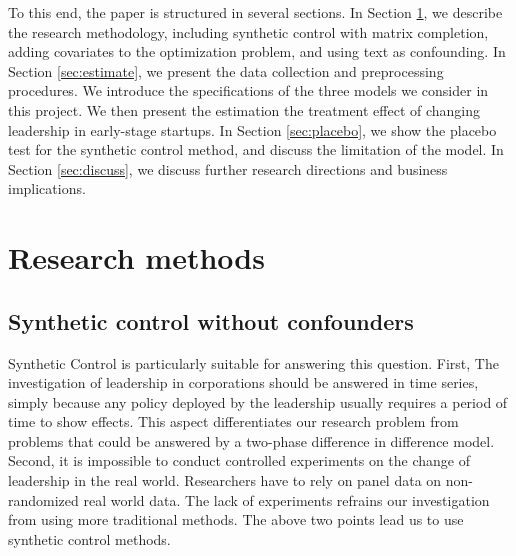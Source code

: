 \documentclass[12pt]{article}
\begin{document}
To this end, the paper is structured in several sections. In Section \ref{sec:methods}, we describe the research methodology, including synthetic control with matrix completion, adding covariates to the optimization problem, and using text as confounding. In Section \ref{sec:estimate}, we present the data collection and preprocessing procedures. We introduce the specifications of the three models we consider in this project. We then present the estimation the treatment effect of changing leadership in early-stage startups. In Section \ref{sec:placebo}, we show the placebo test for the synthetic control method, and discuss the limitation of the model. In Section \ref{sec:discuss}, we discuss further research directions and business implications.


\section{Research methods}
\label{sec:methods}

\subsection{Synthetic control without confounders}
Synthetic Control is particularly suitable for answering this question. First, The investigation of leadership in corporations should be answered in time series, simply because any policy deployed by the leadership usually requires a period of time to show effects. This aspect differentiates our research problem from problems that could be answered by a two-phase difference in difference model. Second, it is impossible to conduct controlled experiments on the change of leadership in the real world. Researchers have to rely on panel data on non-randomized real world data. The lack of experiments refrains our investigation from using more traditional methods. The above two points lead us to use synthetic control methods.
\end{document}
